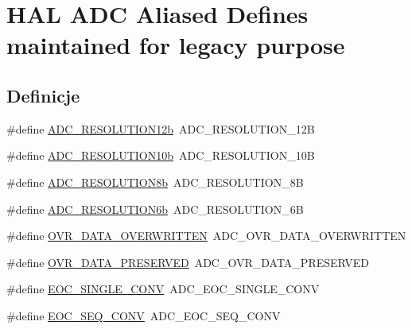 \hypertarget{group___h_a_l___a_d_c___aliased___defines}{}\section{H\+AL A\+DC Aliased Defines maintained for legacy purpose}
\label{group___h_a_l___a_d_c___aliased___defines}
\subsection*{Definicje}
\begin{DoxyCompactItemize}
\item 
\#define \hyperlink{group___h_a_l___a_d_c___aliased___defines_ga6d328c588ea6f273ca698d48441a2a71}{A\+D\+C\+\_\+\+R\+E\+S\+O\+L\+U\+T\+I\+O\+N12b}~A\+D\+C\+\_\+\+R\+E\+S\+O\+L\+U\+T\+I\+O\+N\+\_\+12B
\item 
\#define \hyperlink{group___h_a_l___a_d_c___aliased___defines_gaa695d7ca46602fd4317d5f6a7a2ee071}{A\+D\+C\+\_\+\+R\+E\+S\+O\+L\+U\+T\+I\+O\+N10b}~A\+D\+C\+\_\+\+R\+E\+S\+O\+L\+U\+T\+I\+O\+N\+\_\+10B
\item 
\#define \hyperlink{group___h_a_l___a_d_c___aliased___defines_ga96b87d1645b3ae2e4af88daa006decc4}{A\+D\+C\+\_\+\+R\+E\+S\+O\+L\+U\+T\+I\+O\+N8b}~A\+D\+C\+\_\+\+R\+E\+S\+O\+L\+U\+T\+I\+O\+N\+\_\+8B
\item 
\#define \hyperlink{group___h_a_l___a_d_c___aliased___defines_gaeaba9f99d20e7305507044f975925622}{A\+D\+C\+\_\+\+R\+E\+S\+O\+L\+U\+T\+I\+O\+N6b}~A\+D\+C\+\_\+\+R\+E\+S\+O\+L\+U\+T\+I\+O\+N\+\_\+6B
\item 
\#define \hyperlink{group___h_a_l___a_d_c___aliased___defines_ga46d2fd3222a716456b74ad881eb34039}{O\+V\+R\+\_\+\+D\+A\+T\+A\+\_\+\+O\+V\+E\+R\+W\+R\+I\+T\+T\+EN}~A\+D\+C\+\_\+\+O\+V\+R\+\_\+\+D\+A\+T\+A\+\_\+\+O\+V\+E\+R\+W\+R\+I\+T\+T\+EN
\item 
\#define \hyperlink{group___h_a_l___a_d_c___aliased___defines_ga1fb9c5eb49053187ac90c0af92662be6}{O\+V\+R\+\_\+\+D\+A\+T\+A\+\_\+\+P\+R\+E\+S\+E\+R\+V\+ED}~A\+D\+C\+\_\+\+O\+V\+R\+\_\+\+D\+A\+T\+A\+\_\+\+P\+R\+E\+S\+E\+R\+V\+ED
\item 
\#define \hyperlink{group___h_a_l___a_d_c___aliased___defines_ga8160cf13a85d797ef96972174a863945}{E\+O\+C\+\_\+\+S\+I\+N\+G\+L\+E\+\_\+\+C\+O\+NV}~A\+D\+C\+\_\+\+E\+O\+C\+\_\+\+S\+I\+N\+G\+L\+E\+\_\+\+C\+O\+NV
\item 
\#define \hyperlink{group___h_a_l___a_d_c___aliased___defines_gac7022f73c8906a37c7faf511bc720dda}{E\+O\+C\+\_\+\+S\+E\+Q\+\_\+\+C\+O\+NV}~A\+D\+C\+\_\+\+E\+O\+C\+\_\+\+S\+E\+Q\+\_\+\+C\+O\+NV

\end{DoxyCompactItemize}

